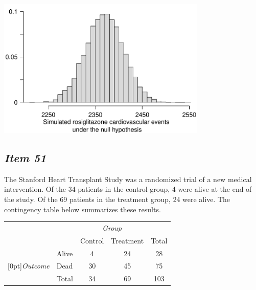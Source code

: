 \begin{center}


\includegraphics[width = 0.75\textwidth]{includes/avandia_RandHist} \\


\end{center}





\subsection{\textbf{\textit{Item 51}}}








The Stanford Heart Transplant Study was a randomized trial of a new medical intervention. Of the 34 patients in the control group, 4 were alive at the end of the study. Of the 69 patients in the treatment group, 24 were alive. The contingency table below summarizes these results.


\begin{center}


\begin{tabular}{ll cc c} 


& & \multicolumn{2}{c}{\textit{Group}} \\


\cline{3-4}


& & Control & Treatment & Total \\


\cline{2-5}


& Alive & 4 & 24 & 28 \\


\raisebox{1.5ex}[0pt]{\emph{Outcome}} & Dead & 30 & 45 & 75\\


\cline{2-5}


& Total & 34 & 69 & 103


\end{tabular}


\end{center}



